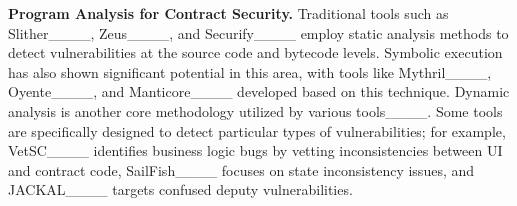 
\noindent
\textbf{Program Analysis for Contract Security.}
Traditional tools such as Slither____, Zeus____, and Securify____ employ static analysis methods to detect vulnerabilities at the source code and bytecode levels. Symbolic execution has also shown significant potential in this area, with tools like Mythril____, Oyente____, and Manticore____ developed based on this technique. Dynamic analysis is another core methodology utilized by various tools____. Some tools are specifically designed to detect particular types of vulnerabilities; for example, VetSC____ identifies business logic bugs by vetting inconsistencies between UI and contract code, SailFish____ focuses on state inconsistency issues, and JACKAL____ targets confused deputy vulnerabilities.

